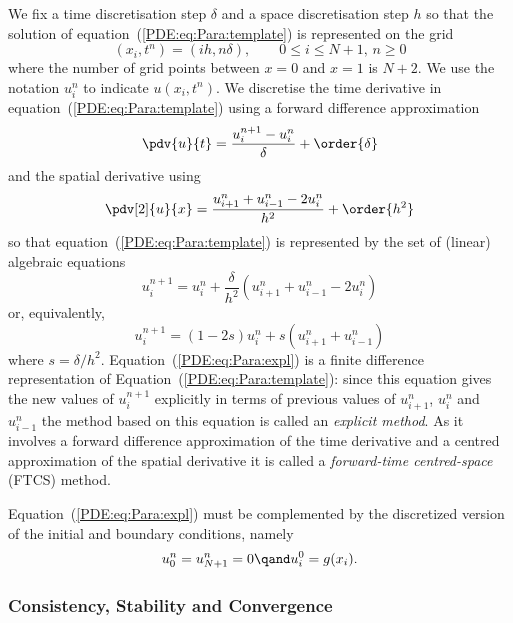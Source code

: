We fix a time discretisation step $\delta$ and a space discretisation
step $h$ so that the solution of equation~(\ref{PDE:eq:Para:template})
is represented on the grid
%
\begin{equation*}
  (x_i,t^n) = (i h, n \delta), \qquad 0 \le i \le N + 1, \, n \ge 0
\end{equation*}
%
where the number of grid points between $x=0$ and $x=1$ is $N+2$.  We
use the notation $u_i^n$ to indicate $u(x_i,t^n)$.  We discretise the
time derivative in equation~(\ref{PDE:eq:Para:template}) using a
forward difference approximation
%
\begin{equation}
  \pdv{u}{t} = \frac{u_i^{n+1}-u_i^{n}}{\delta} + \order{\delta}
  \label{PDE:eq:ut}
\end{equation}
%
and the spatial derivative using
%
\begin{equation}
  \pdv[2]{u}{x} = \frac{u_{i+1}^{n}+u_{i-1}^{n}-2u_{i}^{n}}{h^2} + \order{h^2}
  \label{PDE:eq:uxx}
\end{equation}
%
so that equation~(\ref{PDE:eq:Para:template}) is represented by the
set of (linear) algebraic equations
%
\begin{equation*}
  u_{i}^{n+1} = u_{i}^{n} +
  \frac{\delta}{h^2} (u_{i+1}^{n}+u_{i-1}^{n}-2u_{i}^{n})
\end{equation*}
%
or, equivalently,
%
\begin{equation}
  u_{i}^{n+1} = (1-2s) u_{i}^{n} + s (u_{i+1}^{n}+u_{i-1}^{n})
  \label{PDE:eq:Para:expl}
\end{equation}
%
where $s = \delta/h^2$.  Equation~(\ref{PDE:eq:Para:expl}) is a finite
difference representation of Equation~(\ref{PDE:eq:Para:template}):
since this equation gives the new values of $u_{i}^{n+1}$ explicitly
in terms of previous values of $u_{i+1}^{n}$, $u_{i}^{n}$ and
$u_{i-1}^{n}$ the method based on this equation is called an
\textit{explicit method}.  As it involves a forward difference
approximation of the time derivative and a centred approximation of
the spatial derivative it is called a \textit{forward-time
  centred-space} (FTCS) method.

Equation~(\ref{PDE:eq:Para:expl}) must be complemented by the
discretized version of the initial and boundary conditions, namely
%
\begin{equation*}
  u_{0}^{n} = u_{N+1}^{n} = 0 \qand u_{i}^{0} = g(x_i) .
\end{equation*}

\subsubsection{Consistency, Stability and Convergence}

